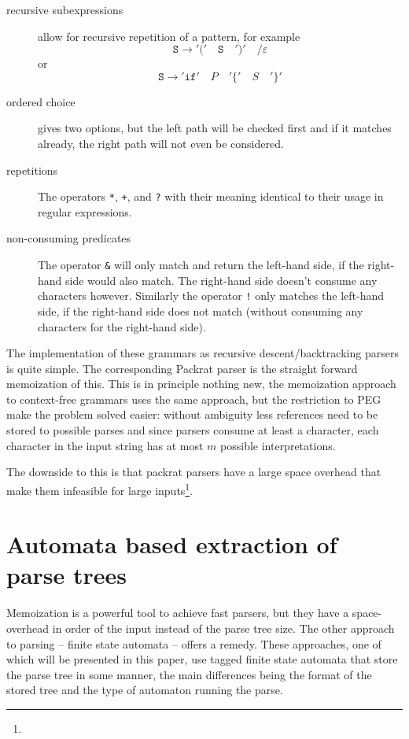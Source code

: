 \documentclass[11pt,a4paper,twoside,openright]{Thesis}
\theoremstyle{definition}
\newcommand{\seclabel}[1]{\label{sec:#1}}
\begin{document}
\begin{description}
  \item[recursive subexpressions] allow for recursive repetition of a 
    pattern, for example 
    \[\mathtt{S} \rightarrow \mathtt{'('}\quad \mathtt{S}\quad \mathtt{')'}\quad \mathtt{/} \varepsilon \]
    or
    \[ \mathtt{S} \rightarrow \mathtt{'if'}\quad P\quad \mathtt{'\{'}\quad S\quad \mathtt{'\}'}\]
  \item[ordered choice] gives two options, but the left path will be checked 
    first and if it matches already, the right path will not even be considered.
  \item[repetitions] The operators \texttt{*}, \texttt{+}, and \texttt{?} 
    with their meaning identical to their usage in regular expressions.
  \item[non-consuming predicates] The operator \texttt{\&} will only match and 
    return the left-hand side, if the right-hand side would also match. The 
    right-hand side doesn't consume any characters however. Similarly the 
    operator \texttt{!} only matches the left-hand side, if the right-hand 
    side does not match (without consuming any characters for the right-hand side).
\end{description}

The implementation of these grammars as recursive descent/backtracking 
parsers is quite simple. The corresponding Packrat parser is the straight
forward memoization of this. This is in principle nothing new, the 
memoization approach to context-free grammars uses the same approach, but the 
restriction to PEG make the problem solved easier: without ambiguity less 
references need to be stored to possible parses and since parsers consume at 
least a character, each character in the input string has at most $m$ 
possible interpretations.

The downside to this is that packrat parsers have a large space overhead that 
make them infeasible for large 
inputs\cite{Beck08a}\footnote{}.

\section{Automata based extraction of parse trees}\seclabel{parse-trees-related}
Memoization is a powerful tool to achieve fast parsers, but they have a 
space-overhead in order of the input instead of the parse tree size. The 
other approach to parsing -- finite state automata -- offers a remedy. These 
approaches, one of which will be presented in this paper, use tagged finite 
state automata that store the parse tree in some manner, the main differences 
being the format of the stored tree and the type of automaton running the parse.
\end{document}
